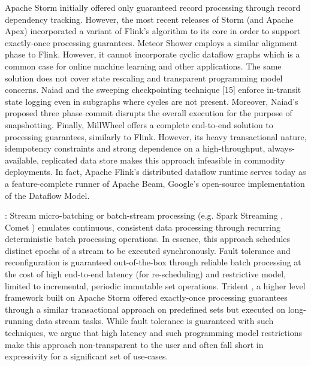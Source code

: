 Apache Storm \cite{CUSTOM:web/Storm} initially offered only guaranteed record processing through record dependency tracking. However, the most recent releases of Storm (and Apache Apex\cite{CUSTOM:web/apex}) incorporated a variant of Flink's algorithm to its core in order to support exactly-once processing guarantees. Meteor Shower \cite{wang2012meteor} employs a similar alignment phase to Flink. However, it cannot incorporate cyclic dataflow graphs which is a common case for online machine learning \cite{de2015samoa} and other applications. The same solution does not cover state rescaling and transparent programming model concerns. Naiad \cite{murray2013naiad} and the sweeping checkpointing technique [15] enforce in-transit state logging even in subgraphs where cycles are not present. Moreover, Naiad's proposed three phase commit disrupts the overall execution for the purpose of snapshotting. Finally, MillWheel \cite{millwheel} offers a complete end-to-end solution to processing guarantees, similarly to Flink. However, its heavy transactional nature, idempotency constraints and strong dependence on a high-throughput, always-available, replicated data store \cite{chang2008bigtable} makes this approach infeasible in commodity deployments. In fact, Apache Flink's distributed dataflow runtime serves today as a feature-complete runner of Apache Beam\cite{CUSTOM:web/beam}, Google's open-source implementation of the Dataflow Model\cite{CUSTOM:web/Dataflow}.

: Stream micro-batching or batch-stream processing (e.g. Spark Streaming \cite{zaharia2012discretized}, Comet \cite{he2010comet}) emulates continuous, consistent data processing through recurring deterministic batch processing operations. In essence, this approach schedules distinct epochs of a stream to be executed synchronously. Fault tolerance and reconfiguration is guaranteed out-of-the-box through reliable batch processing at the cost of high end-to-end latency (for re-scheduling) and restrictive model, limited to incremental, periodic immutable set operations. Trident \cite{CUSTOM:web/trident}, a higher level framework built on Apache Storm offered exactly-once processing guarantees through a similar transactional approach on predefined sets but executed on long-running data stream tasks. While fault tolerance is guaranteed with such techniques, we argue that high latency and such programming model restrictions make this approach non-transparent to the user and often fall short in expressivity for a significant set of use-cases.
